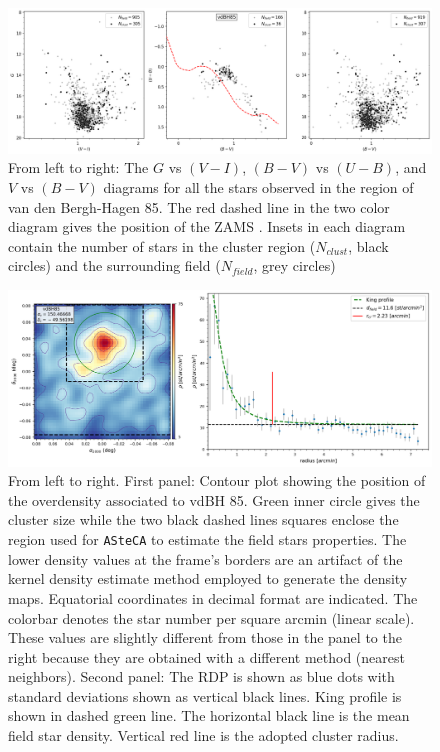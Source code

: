 \documentclass[draft]{aa}
\begin{document}
\begin{figure}[ht]
    \centering
    \includegraphics[width=\hsize]{../figs/obs_vdBH85.png}
\caption{From left to right: The $G$ vs $(V-I)$, $(B-V)$ vs $(U-B)$, and
$V$ vs $(B-V)$ diagrams for all the stars observed in the region of van
den Bergh-Hagen 85.
The red dashed line in the two color diagram gives the position of the ZAMS
\citep{Aller1982}. Insets in each diagram contain the number of stars 
in the cluster region ($N_{clust}$, black circles) and the surrounding
field ($N_{field}$, grey circles)
}
    \label{fig:photom_vdBH85} %
\end{figure}

\begin{figure}[ht]
    \centering
    \includegraphics[width=\hsize]{../figs/dmap_vdbh85.png}
\caption{From left to right. First panel:
Contour plot showing the position of the overdensity associated to vdBH 85.
Green inner circle gives the cluster size while the two black dashed lines
squares enclose the region used for \texttt{ASteCA} to estimate the field stars
properties. The lower density values at the frame's borders are an
artifact of the kernel density estimate method employed to generate the density
maps.
Equatorial coordinates in decimal format are indicated.
The colorbar denotes the star number per square arcmin (linear scale).
These values are slightly different from those in the panel to the right
because they are obtained with a different method (nearest neighbors).
%
Second panel: The RDP is shown as blue dots with standard deviations shown as
vertical black lines. King profile is shown in dashed green line. The
horizontal black line is the mean field star density. Vertical red line is the
adopted cluster radius.
}
    \label{fig:struct_vdBH85}
\end{figure}
\end{document}
